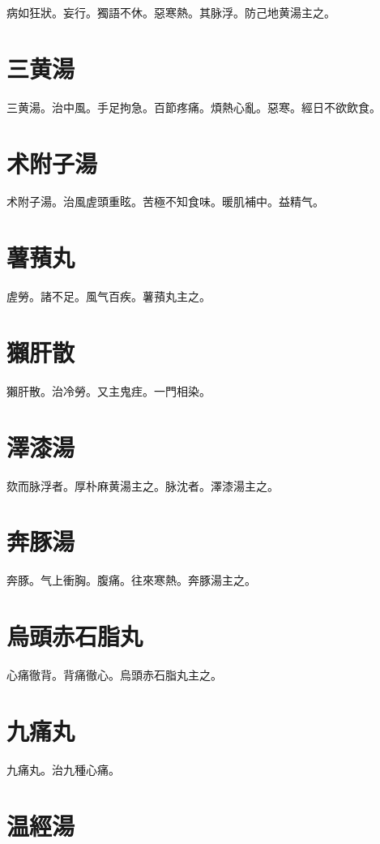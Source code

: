 \documentclass[12pt,twoside,UTF8,b5paper]{ctexbook}
\begin{document}
病如狂狀。妄行。獨語不休。惡寒熱。其脉浮。防己地黄湯主之。

\section{三黄湯}

三黄湯。治中風。手足拘急。百節疼痛。煩熱心亂。惡寒。經日不欲飲食。

\section{术附子湯}

术附子湯。治風虗頭重眩。苦極不知食味。暖肌補中。益精气。

\section{薯蕷丸}

虗勞。諸不足。風气百疾。薯蕷丸主之。

\section{獺肝散}

獺肝散。治冷勞。又主鬼疰。一門相染。

\section{澤漆湯}

欬而脉浮者。厚朴麻黄湯主之。脉沈者。澤漆湯主之。

\section{奔豚湯}

奔豚。气上衝胸。腹痛。往來寒熱。奔豚湯主之。

\section{烏頭赤石脂丸}

心痛徹背。背痛徹心。烏頭赤石脂丸主之。

\section{九痛丸}

九痛丸。治九種心痛。

\section{温經湯}
\end{document}
